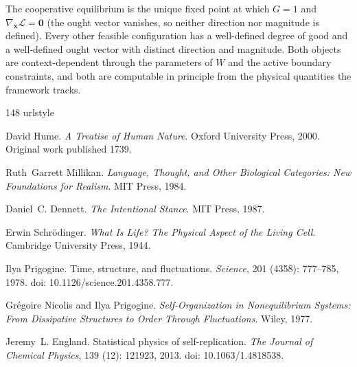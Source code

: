 \documentclass[11pt]{article}
\theoremstyle{plain}
\theoremstyle{definition}
\theoremstyle{remark}
\begin{document}
The cooperative equilibrium is the unique fixed point at which \(G = 1\)
and \(\nabla_{\mathbf{x}} \mathcal{L} = \mathbf{0}\) (the ought vector
vanishes, so neither direction nor magnitude is defined). Every other
feasible configuration has a well-defined degree of good and a
well-defined ought vector with distinct direction and magnitude. Both
objects are context-dependent through the parameters of \(W\) and the
active boundary constraints, and both are computable in principle from
the physical quantities the framework tracks.

\begin{thebibliography}{148}
\providecommand{\natexlab}[1]{#1}
\providecommand{\url}[1]{\texttt{#1}}
\expandafter\ifx\csname urlstyle\endcsname\relax
  \providecommand{\doi}[1]{doi: #1}\else
  \providecommand{\doi}{doi: \begingroup \urlstyle{rm}\Url}\fi

David Hume.
\newblock \emph{A Treatise of Human Nature}.
\newblock Oxford University Press, 2000.
\newblock Original work published 1739.

Ruth~Garrett Millikan.
\newblock \emph{Language, Thought, and Other Biological Categories: New
  Foundations for Realism}.
\newblock MIT Press, 1984.

Daniel~C. Dennett.
\newblock \emph{The Intentional Stance}.
\newblock MIT Press, 1987.

Erwin Schr{\"o}dinger.
\newblock \emph{What Is Life? The Physical Aspect of the Living Cell}.
\newblock Cambridge University Press, 1944.

Ilya Prigogine.
\newblock Time, structure, and fluctuations.
\newblock \emph{Science}, 201 (4358): 777--785, 1978.
\newblock \doi{10.1126/science.201.4358.777}.

Gr{\'e}goire Nicolis and Ilya Prigogine.
\newblock \emph{Self-Organization in Nonequilibrium Systems: From Dissipative
  Structures to Order Through Fluctuations}.
\newblock Wiley, 1977.

Jeremy~L. England.
\newblock Statistical physics of self-replication.
\newblock \emph{The Journal of Chemical Physics}, 139 (12):
  121923, 2013.
\newblock \doi{10.1063/1.4818538}.


\end{thebibliography}
\end{document}
